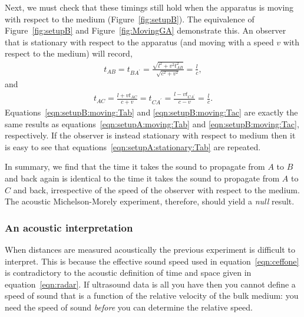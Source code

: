 \documentclass[10pt, fleqn,final,showtrims,oldfontcommands, article,a4paper,oneside]{memoir} %
\newcommand{\eqnref}[1]{\ref{eqn:#1}}
\newcommand{\figref}[1]{Figure~\ref{fig:#1}}
\begin{document}
Next, we must check that these timings still hold when the apparatus is moving with respect to the medium (\figref{setupB}).
The equivalence of \figref{setupB} and \figref{MovingGA} demonstrate this.
An observer that is stationary with respect to the apparatus (and moving with a speed $v$ with respect to the medium) will record,
\begin{align}
  \label{eqn:setupB:moving:Tab}
  t_{AB} = t_{BA^\prime} =  \frac{\sqrt{l^2+v^2t_{AB}^2}}{\sqrt{c^2 +v^2}} = \frac{l}{c},
\end{align}
and 
\begin{align}
  \label{eqn:setupB:moving:Tac}
  t_{AC} =  \frac{l+vt_{AC}}{c+v}= t_{CA^\prime} =  \frac{l-vt_{CA^\prime}}{c-v}= \frac{l}{c}.
\end{align}
Equations~\ref{eqn:setupB:moving:Tab} and \ref{eqn:setupB:moving:Tac}  are exactly the same results as equations~\ref{eqn:setupA:moving:Tab} and \ref{eqn:setupB:moving:Tac},
respectively.
If the observer is instead stationary with respect to medium then it is easy to see that equations~\ref{eqn:setupA:stationary:Tab}  are repeated.

In summary, we find that the time it takes the sound to propagate from $A$ to $B$ and back again is
identical to the time it takes the sound to propagate from $A$ to $C$ and back,
irrespective of the speed of the observer with respect to the medium.
The acoustic Michelson-Morely experiment, therefore, should yield a  {\em null} result.
\subsubsection{An acoustic interpretation}\label{sec:MMLorentzian}

When distances are measured acoustically the previous experiment is  difficult to interpret.
This is because the effective sound speed used in equation~\ref{eqn:ceffone}  is contradictory to the acoustic definition of time and space given in equation~\ref{eqn:radar}.
If ultrasound data is all you have then you cannot define a  speed of sound that is a function of the relative velocity of the bulk medium:
you need the speed of sound {\em before} you can determine the relative speed.


\end{document}
